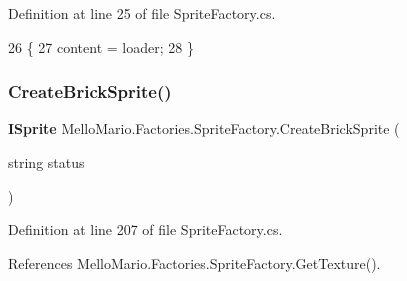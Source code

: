 Definition at line 25 of file Sprite\+Factory.\+cs.


\begin{DoxyCode}
26         \{
27             content = loader;
28         \}
\end{DoxyCode}
\mbox{\label{classMelloMario_1_1Factories_1_1SpriteFactory_a713b8a98b7272c7d9f6f97cedefb8a22}} 
\subsubsection{Create\+Brick\+Sprite()}
{\footnotesize\ttfamily \textbf{ I\+Sprite} Mello\+Mario.\+Factories.\+Sprite\+Factory.\+Create\+Brick\+Sprite (\begin{DoxyParamCaption}\item[{string}]{status }\end{DoxyParamCaption})}



Definition at line 207 of file Sprite\+Factory.\+cs.



References Mello\+Mario.\+Factories.\+Sprite\+Factory.\+Get\+Texture().


